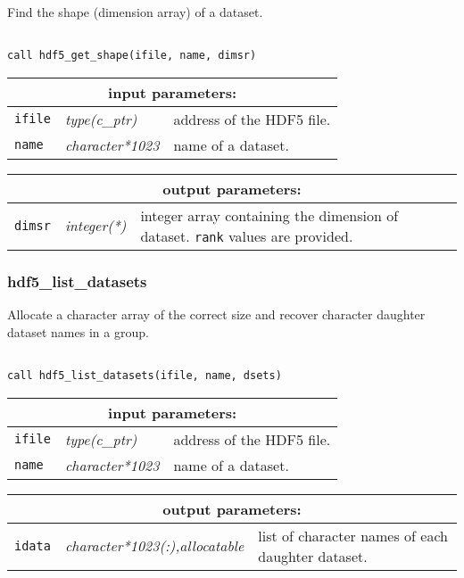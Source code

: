 Find the shape (dimension array) of a dataset.

\begin{verbatim}

call hdf5_get_shape(ifile, name, dimsr)
\end{verbatim}

\noindent
\begin{tabular}{|p{1.5cm}|p{3cm}|p{10cm}|}
\hline
\multicolumn{3}{|c|}{\bf input parameters:} \\
\hline
{\tt ifile} & {\it type(c\_ptr)} & address of the HDF5 file. \\
\hline
{\tt name} & {\it character*1023} & name of a dataset. \\
\hline
\end{tabular}

\vskip 0.8cm

\noindent
\begin{tabular}{|p{1.5cm}|p{3cm}|p{10cm}|}
\hline
\multicolumn{3}{|c|}{\bf output parameters:} \\
\hline
{\tt dimsr} & {\it integer(*)} & integer array containing the dimension of dataset. {\tt rank} values are provided. \\
\hline
\end{tabular}

\subsubsection{hdf5\_list\_datasets}

Allocate a character array of the correct size and recover character daughter dataset names in a group.

\begin{verbatim}

call hdf5_list_datasets(ifile, name, dsets)
\end{verbatim}

\noindent
\begin{tabular}{|p{1.5cm}|p{3cm}|p{10cm}|}
\hline
\multicolumn{3}{|c|}{\bf input parameters:} \\
\hline
{\tt ifile} & {\it type(c\_ptr)} & address of the HDF5 file. \\
\hline
{\tt name} & {\it character*1023} & name of a dataset. \\
\hline
\end{tabular}

\vskip 0.8cm

\noindent
\begin{tabular}{|p{1.5cm}|p{4.5cm}|p{8.5cm}|}
\hline
\multicolumn{3}{|c|}{\bf output parameters:} \\
\hline
{\tt idata} & {\it character*1023(:),allocatable} & list of character names of each daughter dataset.\\
\hline
\end{tabular}

